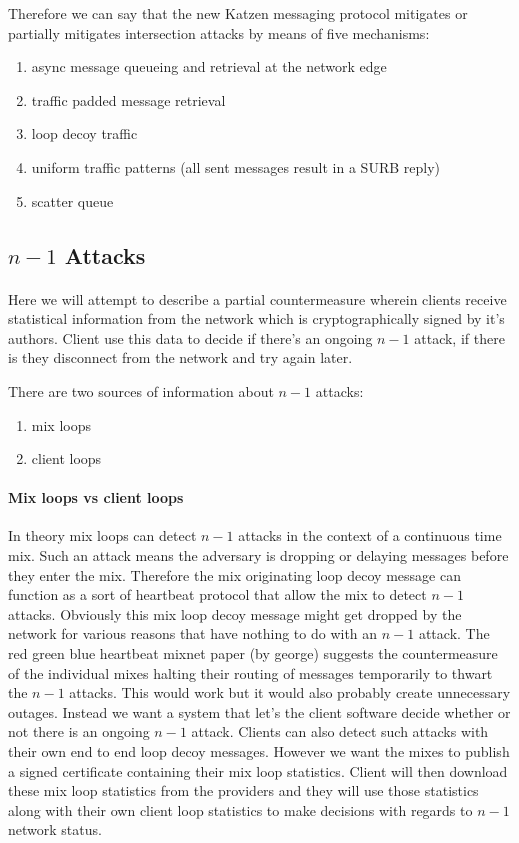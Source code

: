 \documentclass{article}
\begin{document}
Therefore we can say that the new Katzen messaging protocol mitigates or partially mitigates intersection attacks by means
of five mechanisms:\\

\begin{enumerate}
    \item async message queueing and retrieval at the network edge
    \item traffic padded message retrieval
    \item loop decoy traffic
    \item uniform traffic patterns (all sent messages result in a SURB reply)
    \item scatter queue
\end{enumerate}


\subsection{$n-1$ Attacks}

\paragraph{}Here we will attempt to describe a partial countermeasure wherein clients receive statistical
information from the network which is cryptographically signed by it's authors. Client use this data to decide
if there's an ongoing $n-1$ attack, if there is they disconnect from the network and try again later.

There are two sources of information about $n-1$ attacks:
\begin{enumerate}
    \item mix loops
    \item client loops
\end{enumerate}

\paragraph{Mix loops vs client loops} In theory mix loops can detect $n-1$ attacks in the context of a continuous time mix. Such an attack means
the adversary is dropping or delaying messages before they enter the mix. Therefore the mix originating loop decoy message
can function as a sort of heartbeat protocol that allow the mix to detect $n-1$ attacks. Obviously this mix loop decoy message
might get dropped by the network for various reasons that have nothing to do with an $n-1$ attack. The red green blue heartbeat mixnet paper (by george)
suggests the countermeasure of the individual mixes halting their routing of messages temporarily to thwart the $n-1$ attacks.
This would work but it would also probably create unnecessary outages. Instead we want a system that let's the client software
decide whether or not there is an ongoing $n-1$ attack. Clients can also detect such attacks with their own end to end loop decoy messages.
However we want the mixes to publish a signed certificate containing their mix loop statistics. Client will then download these mix loop statistics
from the providers and they will use those statistics along with their own client loop statistics to make decisions with regards to $n-1$ network status.
\end{document}
